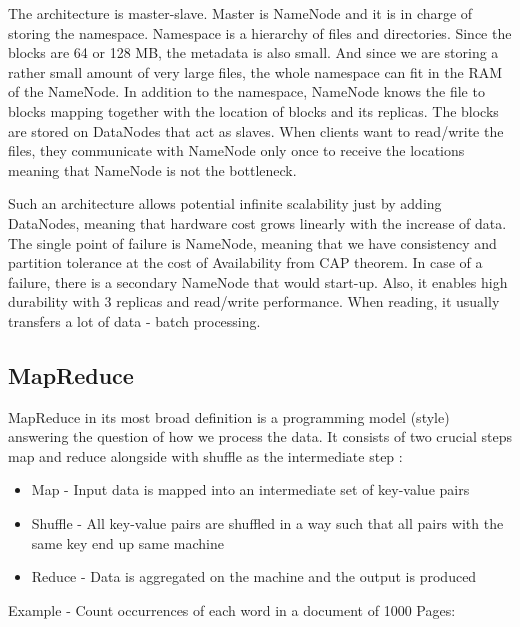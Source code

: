 The architecture is master-slave. Master is NameNode and it is in charge of storing the namespace. Namespace is a hierarchy of files and directories. Since the blocks are 64 or 128 MB, the metadata is also small. And since we are storing a rather small amount of very large files, the whole namespace can fit in the RAM of the NameNode. In addition to the namespace, NameNode knows the file to blocks mapping together with the location of blocks and its replicas. The blocks are stored on DataNodes that act as slaves. When clients want to read/write the files, they communicate with NameNode only once to receive the locations meaning that NameNode is not the bottleneck. 

Such an architecture allows potential infinite scalability just by adding DataNodes, meaning that hardware cost grows linearly with the increase of data. The single point of failure is NameNode, meaning that we have consistency and partition tolerance at the cost of Availability from CAP theorem. In case of a failure, there is a secondary NameNode that would start-up. Also, it enables high durability with 3 replicas and read/write performance. When reading, it usually transfers a lot of data - batch processing.

\subsection{MapReduce}
MapReduce \cite{MapReduce} in its most broad definition is a programming model (style) answering the question of how we process the data. It consists of two crucial steps map and reduce alongside with shuffle as the intermediate step \cite{BigDataCourse}: %
\begin{itemize}
	\item Map - Input data is mapped into an intermediate set of key-value pairs
	\item Shuffle - All key-value pairs are shuffled in a way such that all pairs with the same key end up same machine
	\item Reduce - Data is aggregated on the machine and the output is produced
\end{itemize}
Example - Count occurrences of each word in a document of 1000 Pages:

